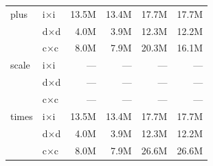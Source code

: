 \begin{longtable}{l l r r r r}
  plus & i×i & 13.5M & 13.4M & 17.7M & 17.7M \\
   & d×d & 4.0M & 3.9M & 12.3M & 12.2M \\
   & c×c & 8.0M & 7.9M & 20.3M & 16.1M \\
\midrule
  scale & i×i & --- & --- & --- & --- \\
   & d×d & --- & --- & --- & --- \\
   & c×c & --- & --- & --- & --- \\
\midrule
  times & i×i & 13.5M & 13.4M & 17.7M & 17.7M \\
   & d×d & 4.0M & 3.9M & 12.3M & 12.2M \\
   & c×c & 8.0M & 7.9M & 26.6M & 26.6M \\
\midrule
\bottomrule
\end{longtable}
